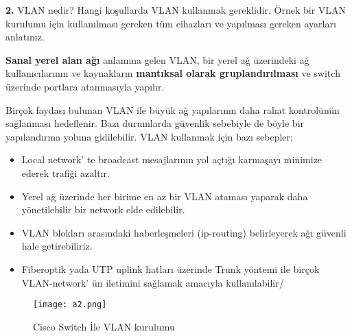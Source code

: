 \documentclass[a4paper,10pt]{article}
\begin{document}
\vspace{0.5cm}

\textbf{2.} VLAN nedir? Hangi koşullarda VLAN kullanmak gereklidir. Örnek bir VLAN kurulumu için
kullanılması gereken tüm cihazları ve yapılması gereken ayarları anlatınız. 

\vspace{0.3cm}

\textbf{Sanal yerel alan ağı} anlamına gelen VLAN, bir yerel ağ üzerindeki ağ kullanıcılarının ve kaynakların
\textbf{mantıksal olarak gruplandırılması} ve switch üzerinde portlara atanmasıyla yapılır.

\vspace{0.4cm}

Birçok faydası bulunan VLAN ile büyük ağ yapılarının daha rahat kontrolünün sağlanması hedeflenir. Bazı
durumlarda güvenlik sebebiyle de böyle bir yapılandırma yoluna gidilebilir. VLAN kullanmak için bazı
sebepler;

\begin{itemize}
  \item Local network' te broadcast mesajlarının yol açtığı karmaşayı minimize ederek trafiği azaltır.
  \item Yerel ağ üzerinde her birime en az bir VLAN ataması yaparak daha yönetilebilir bir network elde
edilebilir.
  \item VLAN blokları arasındaki haberleşmeleri (ip-routing) belirleyerek ağı güvenli hale getirebiliriz.
  \item Fiberoptik yada UTP uplink hatları üzerinde Trunk yöntemi ile birçok VLAN-network' ün iletimini
sağlamak amacıyla kullanılabilir/
\end{itemize}

\pagebreak

\begin{figure}[htb]
\begin{center}
\texttt{[image: a2.png]}
\end{center}
\caption{Cisco Switch İle VLAN kurulumu}
\label{fig:Sistem}
\end{figure}
\end{document}
